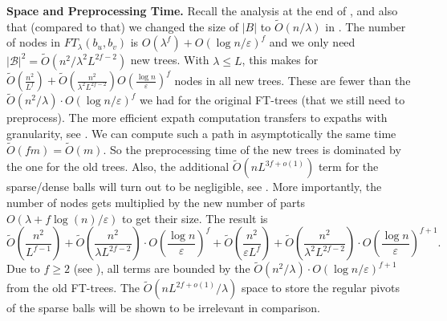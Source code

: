 \documentclass{theoretics}
\newcommand*{\B}{\mathcal{B}}
\newcommand*{\Otilde}{\widetilde{O}}
\renewcommand{\le}{\leqslant}
\renewcommand{\ge}{\geqslant}
\newcommand{\eps}{\varepsilon}
\begin{document}
\noindent
\textbf{Space and Preprocessing Time.}
Recall the analysis at the end of ,
and also that (compared to that) we changed the size of $|B|$ to $\Otilde(n/\lambda)$
in .
The number of nodes in $FT_{\lambda}(b_u,b_v)$ is $O(\lambda^f) + O(\log n/\varepsilon)^f$
and we only need $|\B|^2 = \Otilde(n^2/\lambda^2 L^{2f-2})$ new trees.
With $\lambda \le L$, this makes for
	$\Otilde\!\left(\frac{n^2}{L^{f}} \right) + 
		\Otilde\!\left(\frac{n^2}{\lambda^2 L^{2f-2}}\right)  
			O\!\left(\frac{\log n}{\varepsilon} \right)^f$
nodes in all new trees.
These are fewer than the $\Otilde(n^2/\lambda) \cdot O(\log n/\varepsilon)^f$
we had for the original FT-trees (that we still need to preprocess).
The more efficient expath computation transfers to expaths with granularity,
see .
We can compute such a path in asymptotically the same time $\Otilde(fm) = \Otilde(m)$.
So the preprocessing time of the new trees is dominated by the one for the old trees.
Also, the additional $\Otilde(nL^{3f+o(1)})$ term for the sparse/dense balls
will turn out to be negligible, see .
%
More importantly, the number of nodes
gets multiplied by the new number of parts $O(\lambda+ f \log(n)/\eps)$ to get their size.
The result is
\begin{equation*}
	\Otilde\!\left(\frac{n^2}{L^{f-1}}\right)
		+ \Otilde\!\left(\frac{n^2}{\lambda L^{2f-2}}\right) 
			\cdot O\!\left(\frac{\log n}{\varepsilon} \right)^f +
		\Otilde\!\left(\frac{n^2}{\varepsilon L^{f}}\right)
		+ \Otilde\!\left(\frac{n^2}{\lambda^2 L^{2f-2}}\right) 
			\cdot O\!\left(\frac{\log n}{\varepsilon} \right)^{f+1}\!.
\end{equation*}
Due to $f \ge 2$ (see ),
all terms are bounded by the $\Otilde(n^2/\lambda) \cdot O(\log n/\varepsilon)^{f+1}$
from the old FT-trees.
The $\Otilde(nL^{2f+o(1)}/\lambda)$ space to store the regular pivots
of the sparse balls will be shown to be irrelevant in comparison.
\vspace*{.5em}
\end{document}
